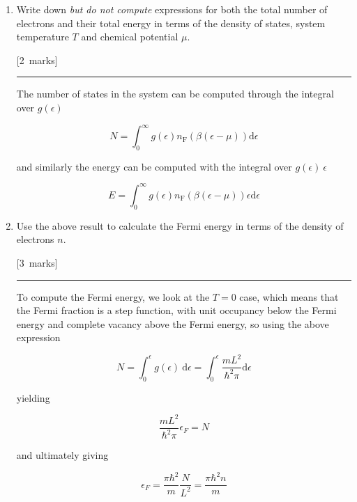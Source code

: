 \documentclass[12pt,a4paper]{article}
\newcommand{\sepline}[0]{\par \hfil\rule{10cm}{0.4pt} \vspace*{\parskip}\hfil}
\begin{document}
\begin{enumerate}
\begin{enumerate}
\begin{enumerate}
						\item Write down \emph{but do not compute} expressions for both the total number of electrons and their total energy in terms of the density of states, system temperature $T$ and chemical potential $\mu$.

						\hfill{[2~marks]}

						\begin{answer}

							\sepline

							The number of states in the system can be computed through the integral over $g(\epsilon)$

							$$ N = \int_0^\infty g(\epsilon) n_{\mathrm{F}}\left(\beta (\epsilon - \mu)\right) \mathrm{d} \epsilon $$

							and similarly the energy can be computed with the integral over $g(\epsilon)~\epsilon$

							$$ E = \int_0^\infty g(\epsilon) n_{\mathrm{F}}\left(\beta (\epsilon - \mu)\right) \epsilon \mathrm{d} \epsilon $$

						\end{answer}

						\item Use the above result to calculate the Fermi energy in terms of the density of electrons $n$.

						\hfill{[3~marks]}

						\begin{answer}

							\sepline

							To compute the Fermi energy, we look at the $T=0$ case, which means that the Fermi fraction is a step function, with unit occupancy below the Fermi energy and complete vacancy above the Fermi energy, so using the above expression

							$$ N = \int_0^\epsilon g(\epsilon) ~ \mathrm{d} \epsilon = \int_0^\epsilon \frac{m L^2}{\hbar^2 \pi} \mathrm{d} \epsilon$$

							yielding

							$$ \frac{m L^2}{\hbar^2 \pi} \epsilon_F = N  $$

							and ultimately giving

							$$ \epsilon_F = \frac{\pi \hbar^2}{m}\frac{N}{L^2} = \frac{\pi \hbar^2 n}{m} $$

						\end{answer}

					\end{enumerate}


\end{enumerate}
\end{enumerate}
\end{document}
